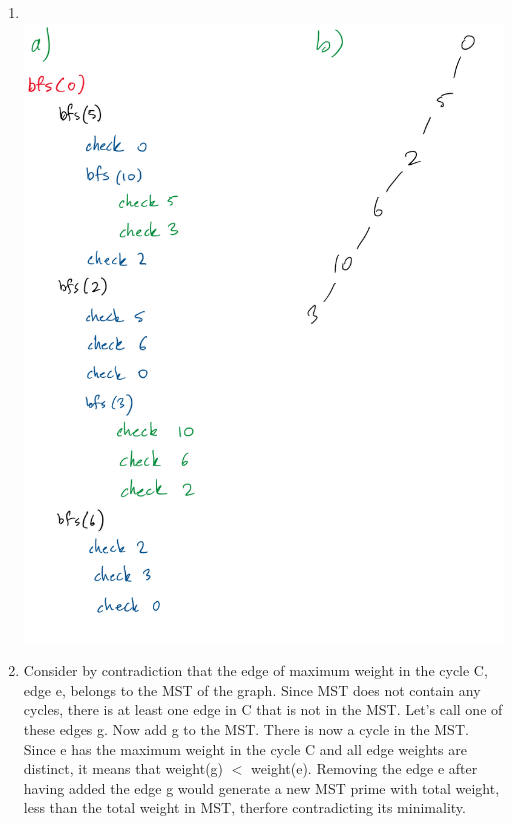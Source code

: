 \documentclass[11pt,fleqn]{article}
\begin{document}
\begin{enumerate}
	\item $~$\\
\includegraphics[scale=0.75]{Q3}

	\item Consider by contradiction that the edge of maximum weight in the cycle C, edge e, belongs to the MST of the graph.
Since MST does not contain any cycles, there is at least one edge in C that is not in the MST. Let's call one of these edges g.
Now add g to the MST. There is now a cycle in the MST. Since e has the maximum weight in the cycle C and all edge weights are distinct, it means that weight(g) $<$ weight(e). 
Removing the edge e after having added the edge g would generate a new MST prime with total weight, less than the total weight in MST, therfore contradicting its minimality.

\newpage


\end{enumerate}
\end{document}
